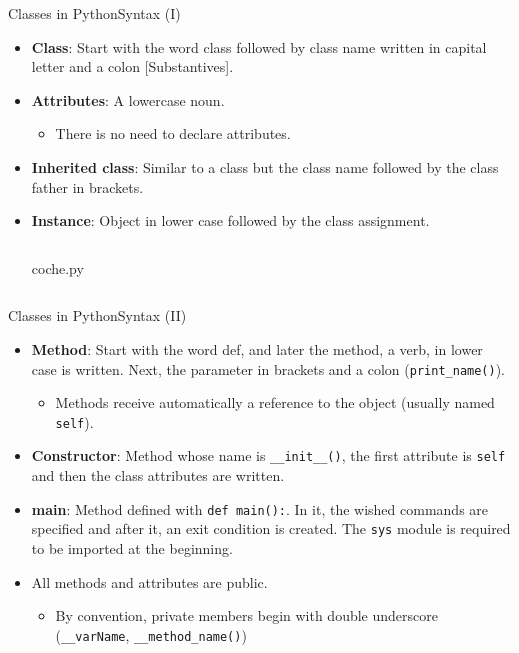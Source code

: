 \documentclass[10pt,compress]{beamer} %
\begin{document}
\begin{frame}{Classes in Python}{Syntax (I)}
\vspace{-0.2cm}
\begin{itemize}			
		\item \small{\textbf{Class}: Start with the word \alert{class} followed by class name written in \alert{capital letter} and a colon [Substantives].}
		\item \small{\textbf{Attributes}: A lowercase noun.}
		\begin{itemize}
		\item \footnotesize{There is no need to declare attributes.}
		\end{itemize}
		
		\item \small{\textbf{Inherited class}: Similar to a class but the class name followed by the class father in brackets.}
		\item \small{\textbf{Instance}: Object in lower case followed by the class assignment.}
			\vspace{-0.2cm} 
  	   \begin{columns}
			\begin{block}{\small{coche.py}}
			\vspace{-0.3cm} 
				\vspace{-0.2cm} 
			\end{block}
	\end{columns}		
\end{itemize}			
\end{frame}

\begin{frame}{Classes in Python}{Syntax (II)}
\begin{itemize}
		\item \textbf{Method}: Start with the word \alert{def}, and later the method, a verb, in lower case is written. Next, the parameter in brackets and a colon (\texttt{print\_name()}).
   \begin{itemize}
   \item Methods receive automatically a reference to the object (usually named \texttt{self}).
   \end{itemize}
		\item \textbf{Constructor}: Method whose name is \texttt{\_\_init\_\_()}, the first attribute is \texttt{self} and then the class attributes are written.

		\item \textbf{main}: Method defined with \texttt{def main():}. In it, the wished commands are specified and after it, an exit condition is created. The \texttt{sys} module  is required to be imported at the beginning. 
		\item All methods and attributes are public.
			\begin{itemize}
				\item By convention, private members begin with double underscore (\texttt{\_\_varName}, \texttt{\_\_method\_name()})
			\end{itemize}
\end{itemize}			
\end{frame}
\end{document}

